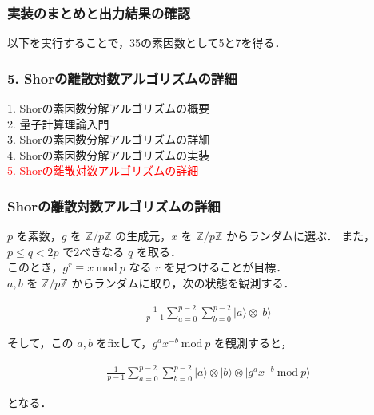 \documentclass[dvipdfmx,12pt]{beamer}
\begin{document}
\begin{frame}

\frametitle{実装のまとめと出力結果の確認}

以下を実行することで，35の素因数として5と7を得る．


                
                    
\end{frame}


\begin{frame}

\frametitle{5. Shorの離散対数アルゴリズムの詳細}
                  
1. Shorの素因数分解アルゴリズムの概要 \\
2. 量子計算理論入門 \\
3. Shorの素因数分解アルゴリズムの詳細 \\
4. Shorの素因数分解アルゴリズムの実装 \\
\textcolor{red}{5. Shorの離散対数アルゴリズムの詳細}
                      
\end{frame}


\begin{frame}

\frametitle{Shorの離散対数アルゴリズムの詳細}

$p$ を素数，$g$ を $ \mathbb{Z} / p \mathbb{Z} $ の生成元，$ x $ を $ \mathbb{Z} / p \mathbb{Z} $ からランダムに選ぶ．
また，$ p \leq q < 2p $ で2べきなる $q$ を取る．\\
このとき，$ g^r \equiv x \ \mathrm{mod} \ p $ なる $r$ を見つけることが目標． \\
$ a, b $ を $ \mathbb{Z} / p \mathbb{Z} $ からランダムに取り，次の状態を観測する． \vspace{-15pt}

\begin{align*}
    \displaystyle \frac{1}{p - 1} \sum_{a = 0}^{p - 2} \sum_{b = 0}^{p - 2} | a \rangle \otimes | b \rangle
\end{align*}

そして，この $ a, b $ をfixして，$ g^a x^{- b} \ \mathrm{mod} \ p $ を観測すると，\vspace{-15pt}

\begin{align*}
    \displaystyle \frac{1}{p - 1} \sum_{a = 0}^{p - 2} \sum_{b = 0}^{p - 2} | a \rangle \otimes | b \rangle \otimes | g^a x^{-b} \ \mathrm{mod} \ p \rangle
\end{align*}

となる．

\end{frame}
\end{document}
